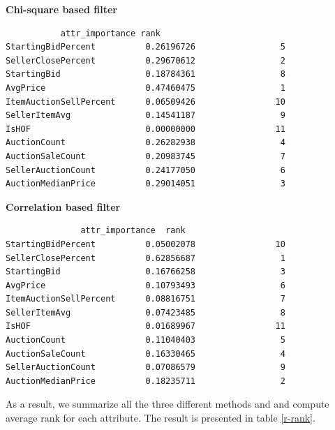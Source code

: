 \documentclass[CEJM,PDF]{cej} %
\begin{document}
\textbf{Chi-square based filter}
\begin{verbatim}
           attr_importance rank
StartingBidPercent          0.26196726                 5
SellerClosePercent          0.29670612                 2
StartingBid                 0.18784361                 8
AvgPrice                    0.47460475                 1
ItemAuctionSellPercent      0.06509426                10
SellerItemAvg               0.14541187                 9
IsHOF                       0.00000000                11
AuctionCount                0.26282938                 4
AuctionSaleCount            0.20983745                 7
SellerAuctionCount          0.24177050                 6
AuctionMedianPrice          0.29014051                 3
\end{verbatim}


\textbf{Correlation based filter}
\begin{verbatim}
               attr_importance 	rank
StartingBidPercent          0.05002078                10
SellerClosePercent          0.62856687                 1
StartingBid                 0.16766258                 3
AvgPrice                    0.10793493                 6
ItemAuctionSellPercent      0.08816751                 7
SellerItemAvg               0.07423485                 8
IsHOF                       0.01689967                11
AuctionCount                0.11040403                 5
AuctionSaleCount            0.16330465                 4
SellerAuctionCount          0.07086579                 9
AuctionMedianPrice          0.18235711                 2
\end{verbatim}


As a result, we summarize all the three different methods and and compute average rank for each attribute. The result is presented in table \ref{r-rank}.
\end{document}
